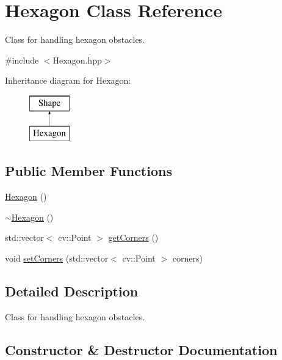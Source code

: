 \hypertarget{class_hexagon}{}\section{Hexagon Class Reference}
\label{class_hexagon}


Class for handling hexagon obstacles.  




{\ttfamily \#include $<$Hexagon.\+hpp$>$}

Inheritance diagram for Hexagon\+:\begin{figure}[H]
\begin{center}
\leavevmode
\includegraphics[height=2.000000cm]{class_hexagon}
\end{center}
\end{figure}
\subsection*{Public Member Functions}
\begin{DoxyCompactItemize}
\item 
\mbox{\hyperlink{class_hexagon_ab503950412a7f11dab9c697c45b614a2}{Hexagon}} ()
\item 
\mbox{\hyperlink{class_hexagon_aaaa69a37657fe47cad3c17d7c3569318}{$\sim$\+Hexagon}} ()
\item 
std\+::vector$<$ cv\+::\+Point $>$ \mbox{\hyperlink{class_hexagon_aa12df068505254931530cbe74ac85ad0}{get\+Corners}} ()
\item 
void \mbox{\hyperlink{class_hexagon_a1b5cdb94637901f346373429660af3b1}{set\+Corners}} (std\+::vector$<$ cv\+::\+Point $>$ corners)
\end{DoxyCompactItemize}


\subsection{Detailed Description}
Class for handling hexagon obstacles. 

\subsection{Constructor \& Destructor Documentation}
\mbox{\label{class_hexagon_ab503950412a7f11dab9c697c45b614a2}} 
